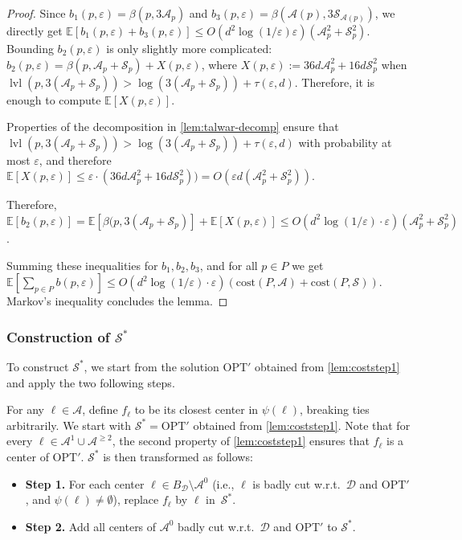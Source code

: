 \documentclass[11pt]{article}
\newcommand{\opt}{\text{OPT}}
\newcommand{\eps}{\varepsilon}
\newcommand{\cost}{\mathrm{cost}}
\newcommand{\E}{\mathbb{E}}
\newcommand{\calD}{\mathcal {D}}
\newcommand{\calS}{\mathcal {S}}
\newcommand{\calL}{\mathcal{A}}
\newcommand{\badcut}{\eps}
\newcommand{\offset}{\tau(\eps, d)}
\DeclareMathOperator{\level}{lvl}
\begin{document}
\begin{proof}
Since $b_1(p, \eps) = \beta(p, 3\calL_p)$ and $b_3(p, \eps) = \beta(\calL(p), 3\calS_{\calL(p)})$, we directly get $\E[b_1(p, \eps) + b_3(p, \eps)] \leq O(d^2 \log(1/\eps) \eps) (\calL_p^2 + \calS_p^2)$. 
Bounding $b_2(p, \eps)$ is only slightly more complicated: $b_2(p, \eps) = \beta(p, \calL_p + \calS_p) + X(p, \eps)$, where $X(p, \eps) := 36  d  \calL_p^2 +  16  d \calS_p^2$ when $\level(p, 3(\calL_p + \calS_p)) > \log(3(\calL_p + \calS_p)) + \offset$. 
Therefore, it is enough to compute $\E[X(p, \eps)]$.

Properties of the decomposition in \cref{lem:talwar-decomp} ensure that $\level(p, 3(\calL_p + \calS_p)) > \log(3(\calL_p + \calS_p)) + \offset$ with probability at most $\badcut$, and therefore $\E[X(p, \eps)] \leq \badcut \cdot (36  d  \calL_p^2 +  16  d \calS_p^2)) = O( \eps d (\calL_p^2 + \calS_p^2))$. 

Therefore, $\E[b_2(p, \eps)] = \E[\beta(p, 3(\calL_p + \calS_p)] + \E[X(p, \eps)] \leq O(d^2 \log(1/\eps) \cdot \eps)(\calL_p^2 + \calS_p^2)$.


Summing these inequalities for $b_1, b_2, b_3$, and for all $p \in P$ we get $\E[\sum_{p \in P} b(p, \eps)] \leq O( d^2  \log(1/\eps) \cdot \eps)(\cost(P, \calL)+ \cost(P, \calS))$. Markov's inequality concludes the lemma. 
\end{proof}

\subsubsection{Construction of $ \calS^*$}

To construct $\calS^*$, we start from the solution $\opt'$ obtained from \cref{lem:coststep1} and apply the two following steps.

For any $\ell \in \calL$, define  $f_\ell$ to be its closest center in $\psi(\ell)$, breaking ties arbitrarily. 
 We 
start with $ \calS^* = \opt'$ obtained from \cref{lem:coststep1}. Note that for every $\ell\in 
 \calL^1 \cup \calL^{\geq 2}$, the second property of \cref{lem:coststep1} ensures that $f_\ell$ is a center of $\opt'$.  $ \calS^*$ is then transformed as follows:
  \begin{itemize}
  \item \textbf{Step 1.} 
    For each center $\ell \in B_\calD\setminus \calL^0$ (i.e., $\ell$ is badly cut w.r.t.\ $\calD$ and $\opt'$, and 
$\psi(\ell)\neq\emptyset$), replace $f_\ell$ by $\ell$ in~$ \calS^*$.
  \item \textbf{Step 2.}
    Add all centers of $ \calL^0$ badly cut w.r.t.\ $\calD$ and $\opt'$ to $ \calS^*$.
  \end{itemize}
\end{document}
